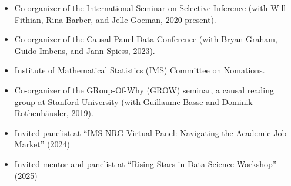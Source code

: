 \documentclass{article}
\begin{document}
\begin{itemize}  
\item Co-organizer of the International Seminar on Selective Inference (with Will Fithian, Rina Barber, and Jelle Goeman, 2020-present).
\item Co-organizer of the Causal Panel Data Conference (with Bryan Graham, Guido Imbens, and Jann Spiess, 2023).
\item Institute of Mathematical Statistics (IMS) Committee on Nomations. 
\item Co-organizer of the GRoup-Of-Why (GROW) seminar, a causal reading group at Stanford University (with Guillaume Basse and Dominik Rothenhäusler, 2019).
\item Invited panelist at ``IMS NRG Virtual Panel: Navigating the Academic Job Market'' (2024)
\item Invited mentor and panelist at ``Rising Stars in Data Science Workshop'' (2025)
\end{itemize}
\end{document}
